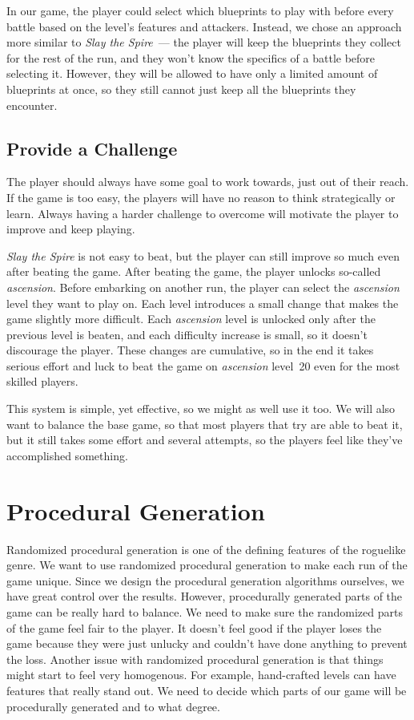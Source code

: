 In our game, the player could select which blueprints to play with before every battle based on the level's features and attackers.
Instead, we chose an approach more similar to \emph{Slay the Spire}~--- the player will keep the blueprints they collect for the rest of the run, and they won't know the specifics of a battle before selecting it.
However, they will be allowed to have only a limited amount of blueprints at once, so they still cannot just keep all the blueprints they encounter.

\subsection{Provide a Challenge} \label{sec:goal-challenge}

The player should always have some goal to work towards, just out of their reach.
If the game is too easy, the players will have no reason to think strategically or learn.
Always having a harder challenge to overcome will motivate the player to improve and keep playing.

\emph{Slay the Spire} is not easy to beat, but the player can still improve so much even after beating the game.
After beating the game, the player unlocks so-called \emph{ascension}.
Before embarking on another run, the player can select the \emph{ascension} level they want to play on.
Each level introduces a small change that makes the game slightly more difficult.
Each \emph{ascension} level is unlocked only after the previous level is beaten, and each difficulty increase is small, so it doesn't discourage the player.
These changes are cumulative, so in the end it takes serious effort and luck to beat the game on \emph{ascension} level~20 even for the most skilled players.

\begin{notindemo}
    This system is simple, yet effective, so we might as well use it too.
    We will also want to balance the base game, so that most players that try are able to beat it, but it still takes some effort and several attempts, so the players feel like they've accomplished something.
\end{notindemo}

\section{Procedural Generation}

Randomized procedural generation is one of the defining features of the roguelike genre.
We want to use randomized procedural generation to make each run of the game unique.
Since we design the procedural generation algorithms ourselves, we have great control over the results.
However, procedurally generated parts of the game can be really hard to balance.
We need to make sure the randomized parts of the game feel fair to the player.
It doesn't feel good if the player loses the game because they were just unlucky and couldn't have done anything to prevent the loss.
Another issue with randomized procedural generation is that things might start to feel very homogenous.
For example, hand-crafted levels can have features that really stand out.
We need to decide which parts of our game will be procedurally generated and to what degree.


